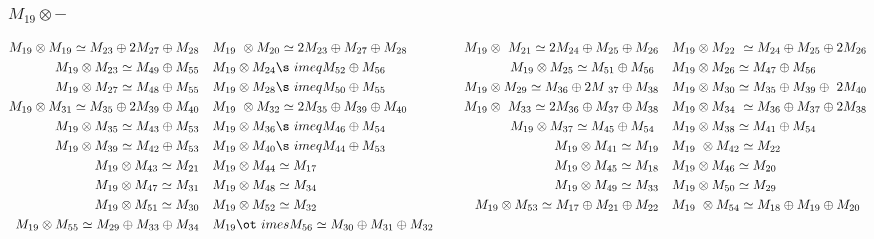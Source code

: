 \subsubsection{$M_19\otimes -$}
\begin{align*}
M_{19} \otimes M_{19} \simeq M_{23} \oplus 2 M_{27} \oplus M_{28} &&& M_{19} \
\otimes M_{20} \simeq 2 M_{23} \oplus M_{27} \oplus M_{28} &&& M_{19} \otimes \
M_{21} \simeq 2 M_{24} \oplus M_{25} \oplus M_{26} &&& M_{19} \otimes M_{22} \
\simeq M_{24} \oplus M_{25} \oplus 2 M_{26}\\
M_{19} \otimes M_{23} \simeq M_{49} \oplus M_{55} &&& M_{19} \otimes M_{24} \s\
imeq M_{52} \oplus M_{56} &&& M_{19} \otimes M_{25} \simeq M_{51} \oplus M_{56\
} &&& M_{19} \otimes M_{26} \simeq M_{47} \oplus M_{56}\\
M_{19} \otimes M_{27} \simeq M_{48} \oplus M_{55} &&& M_{19} \otimes M_{28} \s\
imeq M_{50} \oplus M_{55} &&& M_{19} \otimes M_{29} \simeq M_{36} \oplus 2 M_{\
37} \oplus M_{38} &&& M_{19} \otimes M_{30} \simeq M_{35} \oplus M_{39} \oplus\
 2 M_{40}\\
M_{19} \otimes M_{31} \simeq M_{35} \oplus 2 M_{39} \oplus M_{40} &&& M_{19} \
\otimes M_{32} \simeq 2 M_{35} \oplus M_{39} \oplus M_{40} &&& M_{19} \otimes \
M_{33} \simeq 2 M_{36} \oplus M_{37} \oplus M_{38} &&& M_{19} \otimes M_{34} \
\simeq M_{36} \oplus M_{37} \oplus 2 M_{38}\\
M_{19} \otimes M_{35} \simeq M_{43} \oplus M_{53} &&& M_{19} \otimes M_{36} \s\
imeq M_{46} \oplus M_{54} &&& M_{19} \otimes M_{37} \simeq M_{45} \oplus M_{54\
} &&& M_{19} \otimes M_{38} \simeq M_{41} \oplus M_{54}\\
M_{19} \otimes M_{39} \simeq M_{42} \oplus M_{53} &&& M_{19} \otimes M_{40} \s\
imeq M_{44} \oplus M_{53} &&& M_{19} \otimes M_{41} \simeq M_{19} &&& M_{19} \
\otimes M_{42} \simeq M_{22}\\
M_{19} \otimes M_{43} \simeq M_{21} &&& M_{19} \otimes M_{44} \simeq M_{17} &&\
& M_{19} \otimes M_{45} \simeq M_{18} &&& M_{19} \otimes M_{46} \simeq M_{20}\
\\
M_{19} \otimes M_{47} \simeq M_{31} &&& M_{19} \otimes M_{48} \simeq M_{34} &&\
& M_{19} \otimes M_{49} \simeq M_{33} &&& M_{19} \otimes M_{50} \simeq M_{29}\
\\
M_{19} \otimes M_{51} \simeq M_{30} &&& M_{19} \otimes M_{52} \simeq M_{32} &&\
& M_{19} \otimes M_{53} \simeq M_{17} \oplus M_{21} \oplus M_{22} &&& M_{19} \
\otimes M_{54} \simeq M_{18} \oplus M_{19} \oplus M_{20}\\
M_{19} \otimes M_{55} \simeq M_{29} \oplus M_{33} \oplus M_{34} &&& M_{19} \ot\
imes M_{56} \simeq M_{30} \oplus M_{31} \oplus M_{32}\\
\end{align*}

